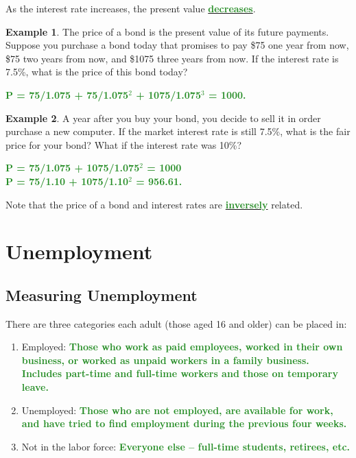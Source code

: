 \documentclass[11pt]{article}\usepackage[]{graphicx}\usepackage[]{color}
\theoremstyle{definition}
\newtheorem{exmp}{Example}[section]
\newcommand{\blank}[1]{}
\newcommand{\ddp}[1]{{\textbf{\textcolor{ForestGreen}{#1}}}}
\newcommand{\dd}[1]{{\underline{\textbf{\textcolor{ForestGreen}{#1}}}}}
\begin{document}
As the interest rate increases, the present value \dd{decreases}.

\begin{exmp} 
The price of a bond is the present value of its future payments. Suppose you purchase a bond today that promises to pay \$75 one year from now, \$75 two years from now, and \$1075 three years from now. If the interest rate is 7.5\%, what is the price of this bond today? 
\end{exmp}
\ddp{P = 75/1.075 + 75/1.075$^2$ + 1075/1.075$^3$ = 1000.}
\blank{}

\begin{exmp}
 A year after you buy your bond, you decide to sell it in order purchase a new computer. If the market interest rate is still 7.5\%, what is the fair price for your bond? What if the interest rate was 10\%?
\end{exmp}
\ddp{P = 75/1.075 + 1075/1.075$^2$ = 1000 \\
	P = 75/1.10 + 1075/1.10$^2$ = 956.61.\\}
\blank{}
\blank{}

Note that the price of a bond and interest rates are \dd{inversely} related.


\newpage


\section{Unemployment}

\subsection{Measuring Unemployment}

There are three categories each adult (those aged 16 and older) can be placed in:

\begin{enumerate}
	\setlength{\itemsep}{1.5em}
	\item Employed: \ddp{Those who work as paid employees, worked in their own business, or worked as unpaid workers in a family business. Includes part-time and full-time workers and those on temporary leave.}
	\item Unemployed: \ddp{Those who are not employed, are available for work, and have tried to find employment during the previous four weeks.}
	\item Not in the labor force: \ddp{Everyone else -- full-time students, retirees, etc.}
\end{enumerate}
\end{document}
